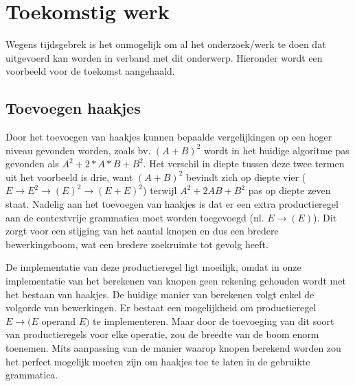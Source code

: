 \documentclass[Main.tex]{subfiles}
\begin{document}
\section{Toekomstig werk}
Wegens tijdsgebrek is het onmogelijk om al het onderzoek/werk te doen dat uitgevoerd kan worden in verband met dit onderwerp. Hieronder wordt een voorbeeld voor de toekomst aangehaald.

\subsection*{Toevoegen haakjes}
Door het toevoegen van haakjes kunnen bepaalde vergelijkingen op een hoger niveau gevonden worden, zoals bv. $(A+B)^2$ wordt in het huidige algoritme pas gevonden als $A^{2}+2 \ast A \ast B+B^{2}$. Het verschil in diepte tussen deze twee termen uit het voorbeeld is drie, want $(A+B)^2$ bevindt zich op diepte vier ($E \rightarrow E^{2} \rightarrow (E)^{2} \rightarrow (E+E)^{2}$) terwijl $A^{2}+2AB+B^{2}$ pas op diepte zeven staat. Nadelig aan het toevoegen van haakjes is dat er een extra productieregel aan de contextvrije grammatica moet worden toegevoegd (nl. $E \rightarrow (E)$). Dit zorgt voor een stijging van het aantal knopen en dus een bredere bewerkingsboom, wat een bredere zoekruimte tot gevolg heeft. 

\par De implementatie van deze productieregel ligt moeilijk, omdat in onze implementatie van het berekenen van knopen geen rekening gehouden wordt met het bestaan van haakjes. De huidige manier van berekenen volgt enkel de volgorde van bewerkingen. Er bestaat een mogelijkheid om productieregel $E \rightarrow (E$ operand $E)$ te implementeren. Maar door de toevoeging van dit soort van productieregels voor elke operatie, zou de breedte van de boom enorm toenemen. Mits aanpassing van de manier waarop knopen berekend worden zou het perfect mogelijk moeten zijn om haakjes toe te laten in de gebruikte grammatica.
\end{document}
